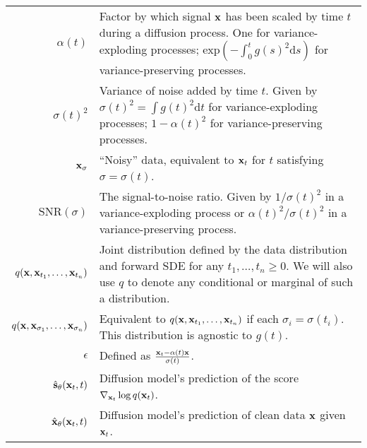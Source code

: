 \begin{table*}
\begin{tabular}{rp{9cm}}
    $\alpha(t)$                             & Factor by which signal ${\mathbf{x}}$ has been scaled by time $t$ during a diffusion process. One for variance-exploding processes; $\text{exp}(-\int_0^t g(s)^2 \mathrm{d}s)$ for variance-preserving processes. \\
    $\sigma(t)^2$                           & Variance of noise added by time $t$. Given by $\sigma(t)^2 = \int g(t)^2 \mathrm{d}t$ for variance-exploding processes; $1-\alpha(t)^2$ for variance-preserving processes. \\
    ${\mathbf{x}}_\sigma$                           & ``Noisy'' data, equivalent to ${\mathbf{x}}_t$ for $t$ satisfying $\sigma = \sigma(t)$. \\
    $\text{SNR}(\sigma)$                    & The signal-to-noise ratio. Given by $1/\sigma(t)^2$ in a variance-exploding process or $\alpha(t)^2 / \sigma(t)^2$ in a variance-preserving process. \\
    $q({\mathbf{x}},{\mathbf{x}}_{t_1},\ldots,{\mathbf{x}}_{t_n})$   & Joint distribution defined by the data distribution and forward SDE for any $t_1,\ldots,t_n \geq 0$. We will also use $q$ to denote any conditional or marginal of such a distribution.  \\
    $q({\mathbf{x}},{\mathbf{x}}_{\sigma_1},\ldots,{\mathbf{x}}_{\sigma_n})$   & Equivalent to $q({\mathbf{x}},{\mathbf{x}}_{t_1},\ldots,{\mathbf{x}}_{t_n})$ if each $\sigma_i = \sigma(t_i)$. This distribution is agnostic to $g(t)$. \\
    $\epsilon$                               & Defined as $\frac{{\mathbf{x}}_t-\alpha(t){\mathbf{x}}}{\sigma(t)}$. \\
    $\hat{{\mathbf{s}}}_\theta({\mathbf{x}}_t, t)$  & Diffusion model's prediction of the score $\nabla_{{\mathbf{x}}_t} \log q({\mathbf{x}}_t)$. \\
    $\hat{{\mathbf{x}}}_\theta({\mathbf{x}}_t, t)$  & Diffusion model's prediction of clean data ${\mathbf{x}}$ given ${\mathbf{x}}_t$. \\

\end{tabular}
\end{table*}
